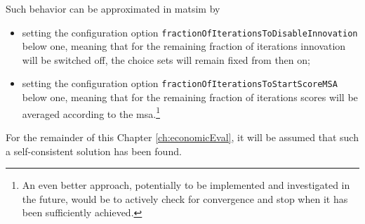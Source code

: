 Such behavior can be approximated
%
%
in \acrshort{matsim} by
%
\begin{itemize}\styleItemize
\item setting the configuration option \verb$fractionOfIterationsToDisableInnovation$ below one,  meaning that for the remaining fraction of iterations innovation will be switched off, \ie the choice sets will remain fixed from then on;

\item setting the configuration option \verb$fractionOfIterationsToStartScoreMSA$ below one, meaning that for the remaining fraction of iterations scores will be averaged according to the \gls{msa}.\footnote{%
%
An even better approach, potentially to be implemented and investigated in the future, would be to actively check for convergence and stop when it has been sufficiently achieved.
%
}
\end{itemize}
For the remainder of this Chapter \ref{ch:economicEval}, it will be assumed that such a self-consistent solution has been found.
%

%

